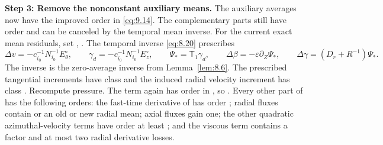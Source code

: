 \noindent\textbf{Step 3: Remove the nonconstant auxiliary means.} The auxiliary averages now have
the improved order in \eqref{eq:9.14}. The complementary parts still have order
 and can be canceled by the temporal mean inverse. For the current exact
mean residuals, set
,
. The temporal inverse \eqref{eq:8.20} prescribes
\[
\Delta v=-c_{i_0}^{-1}N_{i_0}^{-1}E_\theta^\circ,
\qquad
\gamma_d=-c_{i_0}^{-1}N_{i_0}^{-1}E_z^\circ,
\qquad
\Psi_*=\mathsf T_1\gamma_d,
\qquad
\Delta\beta=-\varepsilon\partial_Z\Psi_*,
\qquad
\Delta\gamma=(D_r+R^{-1})\Psi_*.
\]
The inverse  is the zero-average inverse from
Lemma~\ref{lem:8.6}. The prescribed tangential increments have class
 and the induced radial velocity increment has class
. Recompute pressure. The term
 again has order  in
, so . Every other
part of  has the following orders: the fast-time derivative of
 has order ; radial fluxes contain
 or an old or new radial mean; axial fluxes gain one; the other quadratic
azimuthal-velocity terms have order at least ; and the viscous term
contains a factor  and at most two radial derivative losses.

